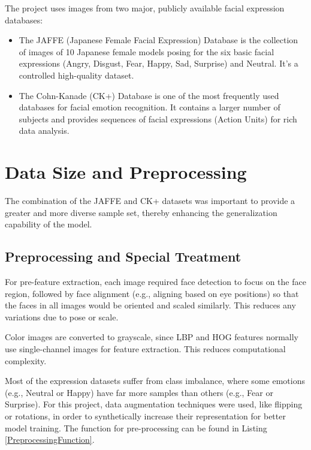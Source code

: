 The project uses images from two major, publicly available facial expression databases:

\begin{itemize}
	\item The JAFFE (Japanese Female Facial Expression) Database is the collection of images of 10 Japanese female models posing for the six basic facial expressions (Angry, Disgust, Fear, Happy, Sad, Surprise) and Neutral. It's a controlled high-quality dataset.
	\item The Cohn-Kanade (CK+) Database is one of the most frequently used databases for facial emotion recognition. It contains a larger number of subjects and provides sequences of facial expressions (Action Units) for  rich data analysis.
\end{itemize}

\section{Data Size and Preprocessing}

The combination of the JAFFE and CK+ datasets was important to provide a greater and more diverse sample set, thereby enhancing the generalization capability of the model.
\newline

\subsection{Preprocessing and Special Treatment}

For pre-feature extraction, each image required face detection to focus on the face region, followed by face alignment (e.g., aligning based on eye positions) so that the faces in all images would be oriented and scaled similarly. This reduces any variations due to pose or scale.

Color images are converted to grayscale, since LBP and HOG features normally use single-channel images for feature extraction. This reduces computational complexity.

Most of the expression datasets suffer from class imbalance, where some emotions (e.g., Neutral or Happy) have far more samples than others (e.g., Fear or Surprise). For this project, data augmentation techniques were used, like flipping or rotations, in order to synthetically increase their representation for better model training.
The function for pre-processing can be found in Listing \ref{PreprocessingFunction}.
\newline

